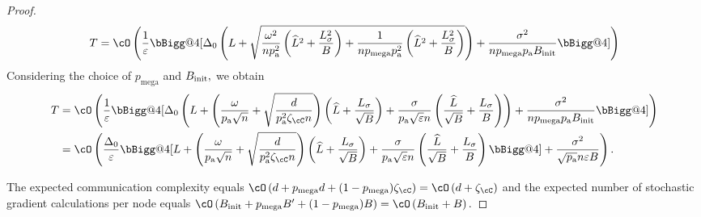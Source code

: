 \documentclass{article}
\makeatletter
\newcommand*{\probavailable}{\ensuremath{p_{\textnormal{a}}}}
\newcommand*{\probmega}{\ensuremath{p_{\text{mega}}}}
\newcommand{\vast}{\bBigg@{4}}
\makeatother
\begin{document}
\begin{proof}
  \begin{align*}
    T = \cO\left(\frac{1}{\varepsilon}\vast[\Delta_0\left(L + \sqrt{\frac{\omega^2}{n \probavailable^2}\left(\widehat{L}^2 + \frac{L_{\sigma}^2}{B}\right) + \frac{1}{n \probmega \probavailable^2} \left(\widehat{L}^2 + \frac{L_{\sigma}^2}{B}\right)}\right) + \frac{\sigma^2}{n \probmega \probavailable B_{\textnormal{init}}} \vast]\right)
  \end{align*}
  Considering the choice of $\probmega$ and $B_{\textnormal{init}},$ we obtain
  \begin{align*}
    T &=\cO\left(\frac{1}{\varepsilon}\vast[\Delta_0\left(L + \left(\frac{\omega}{\probavailable\sqrt{n}} + \sqrt{\frac{d}{\probavailable^2 \zeta_{\cC} n}}\right) \left(\widehat{L} + \frac{L_{\sigma}}{\sqrt{B}}\right)  + \frac{\sigma}{\probavailable \sqrt{\varepsilon} n} \left(\frac{\widehat{L}}{\sqrt{B}} + \frac{L_{\sigma}}{B}\right)\right) + \frac{\sigma^2}{n \probmega \probavailable B_{\textnormal{init}}} \vast]\right) \\
    &=\cO\left(\frac{\Delta_0}{\varepsilon}\vast[L + \left(\frac{\omega}{\probavailable\sqrt{n}} + \sqrt{\frac{d}{\probavailable^2 \zeta_{\cC} n}}\right) \left(\widehat{L} + \frac{L_{\sigma}}{\sqrt{B}}\right)  + \frac{\sigma}{\probavailable \sqrt{\varepsilon} n} \left(\frac{\widehat{L}}{\sqrt{B}} + \frac{L_{\sigma}}{B}\right)\vast] + \frac{\sigma^2}{\sqrt{\probavailable} n \varepsilon B}\right).
  \end{align*}

  The expected communication complexity equals $\cO\left(d + \probmega d + (1 - \probmega) \zeta_{\cC} \right) = \cO\left(d + \zeta_{\cC} \right)$ and the expected number of stochastic gradient calculations per node equals $\cO\left(B_{\textnormal{init}} + \probmega B' + (1 - \probmega) B\right) = \cO\left(B_{\textnormal{init}} + B\right).$
\end{proof}

\CONVERGENCESYNCPLMVR*
\end{document}
